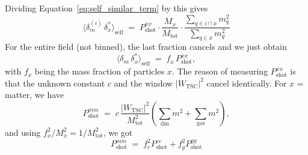\documentclass{article}
\begin{document}
Dividing Equation~\ref{eq:self_similar_term} by this gives 
\begin{equation}
    \langle \delta_m^{(i)} \, \delta_x^* \rangle_\mathrm{self} \;=\;P^{xx}_\mathrm{shot} \cdot \frac{M_x}{M_\mathrm{tot}} \cdot \frac{\sum_{q \in i \cap x} m_q^2}{\sum_{q \in x} m_q^2}
\end{equation}
For the entire field (not binned), the last fraction cancels and we just obtain
\begin{equation}
    \langle \delta_m \, \delta_x^* \rangle_\mathrm{self} \;=\; f_x \,P_\mathrm{shot}^{xx},
\end{equation}
with $f_x$ being the mass fraction of particles $x$. The reason of measuring $P^{xx}_\mathrm{shot}$ is that the unknown constant $c$ and the window $|W_\mathrm{TSC}|^2$ cancel identically. For $x$ = matter, we have
\begin{equation}
    P^{mm}_\mathrm{shot} \;=\; c \, \frac{|W_\mathrm{TSC}|^2}{M_\mathrm{tot}^2} \left( \sum_\mathrm{dm} m^2 + \sum_\mathrm{gas} m^2\right),
\end{equation}
and using $f_x^2 / M_x^2 = 1 / M_\mathrm{tot}^2$, we got 
\begin{equation}
    P^{mm}_\mathrm{shot} \;=\;f_c^2 P^{cc}_\mathrm{shot} + f_g^2 P^{gg}_\mathrm{shot}
\end{equation}
\end{document}
